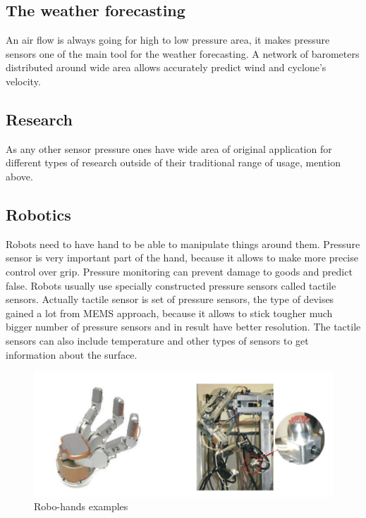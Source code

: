 \documentclass[english]{article}
\begin{document}
\subsection{The weather forecasting}

An air flow is always going for high to low pressure area, it makes pressure sensors one of the main tool for the weather forecasting. A network of barometers distributed around wide area allows accurately predict wind and cyclone's velocity.

\subsection{Research}

As any other sensor pressure ones have wide area of original application for different types of research outside of their traditional range of usage, mention above.

\subsection{Robotics}

Robots need to have hand to be able to manipulate things around them. Pressure sensor is very important part of the hand, because it allows to make more precise control over grip. Pressure monitoring can prevent damage to goods and predict false. Robots usually use specially constructed pressure sensors called tactile sensors. Actually tactile sensor is set of pressure sensors, the type of devises gained a lot from MEMS approach, because it allows to stick tougher much bigger number of pressure sensors and in result have better resolution. The tactile sensors can also include temperature and other types of sensors to get information about the surface.\cite{app}

\begin{figure}[H]
\centerline{\includegraphics[scale=0.7]{PressureSensors/app}}
\caption{Robo-hands examples\label{fig:app} \cite{app}}
\end{figure}
\end{document}
